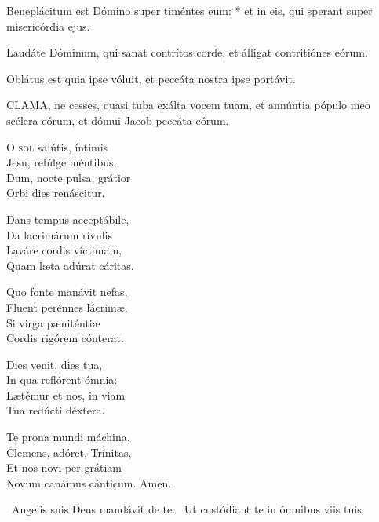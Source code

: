Beneplácitum est Dómino super timéntes eum: * et in eis, qui sperant super misericórdia ejus.

 Laudáte Dóminum, qui sanat contrítos corde, et álligat contritiónes eórum.


 Oblátus est quia ipse vóluit, et peccáta nostra ipse portávit.




\lettrine[lines=2]{C}{LAMA}, ne cesses, quasi tuba exálta vocem tuam, et annúntia pópulo meo scélera eórum, et dómui Jacob peccáta eórum.


\lettrine[lines=2]{O}{} \textsc{sol} salútis, íntimis\\
Jesu, refúlge méntibus,\\
Dum, nocte pulsa, grátior\\
Orbi dies renáscitur.

Dans tempus acceptábile,\\
Da lacrimárum rívulis\\
Laváre cordis víctimam,\\
Quam læta adúrat cáritas.

Quo fonte manávit nefas,\\
Fluent perénnes lácrimæ,\\
Si virga pæniténtiæ\\
Cordis rigórem cónterat.

Dies venit, dies tua,\\
In qua reflórent ómnia:\\
Lætémur et nos, in viam\\
Tua redúcti déxtera.

Te prona mundi máchina,\\
Clemens, adóret, Trínitas,\\
Et nos novi per grátiam\\
Novum canámus cánticum. Amen.

\V\ Angelis suis Deus mandávit de te. \R\ Ut custódiant te in ómnibus viis tuis.



